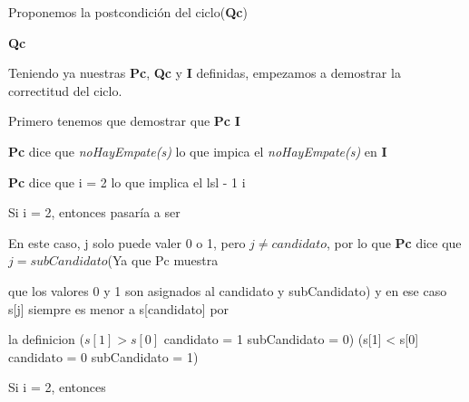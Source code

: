 \documentclass[10pt,a4paper]{article}
\begin{document}
Proponemos la postcondición del ciclo(\textbf{Qc})

\vspace{5mm}

 \textbf{Qc}  \equiv 
 
 { \wedge 
 
 {

\vspace{5mm}

Teniendo ya nuestras \textbf{Pc}, \textbf{Qc} y \textbf{I} definidas, empezamos a demostrar la correctitud del ciclo.

\vspace{5mm}

Primero tenemos que demostrar que \textbf{Pc} \implies \textbf{I}

\vspace{5mm}

\textbf{Pc} dice que \textit{noHayEmpate(s)} lo que impica el \textit{noHayEmpate(s)} en \textbf{I}

\textbf{Pc} dice que i = 2 lo que implica el lsl - 1 \geq i 

\vspace{2mm}
Si i = 2, entonces pasaría a ser 


En este caso, j solo puede valer 0 o 1, pero $j \neq candidato$, por lo que \textbf{Pc} dice que $j = subCandidato$(Ya que Pc muestra

que los valores 0 y 1 son asignados al candidato y subCandidato) y en ese caso s[j] siempre es menor a s[candidato] por 

la definicion ($s[1] > s[0]$ \wedge candidato = 1 \wedge subCandidato = 0) \lor  (s[1] < s[0] \wedge candidato = 0 \wedge subCandidato = 1) 

\vspace{2mm}

Si i = 2, entonces 

}}
\end{document}
